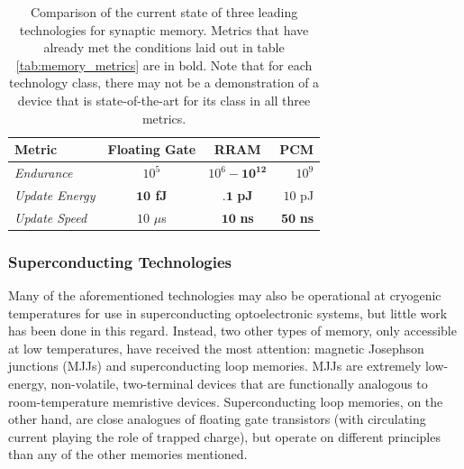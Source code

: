 \documentclass[twocolumn]{article}
\begin{document}
\begin{table}[h!]
  \begin{center}
    \label{tab:memory_comparison}
    \begin{tabular}{l|c|c|r} %
      \textbf{Metric} & \textbf{Floating Gate} & \textbf{RRAM} &\textbf{PCM} \\
      \hline
      \textit{Endurance} & $10^{5}$ & $10^{6}-\mathbf{10^{12}}$ & $10^{9}$  \\
      \textit{Update Energy} & \textbf{$\textbf{10}$ fJ} & $\textbf{.1}$ \textbf{pJ} & $10$ pJ\\
      \textit{Update Speed} & $10$ $\mu$s  & $\textbf{10}$ \textbf{ns} & $\textbf{50}$ \textbf{ns}\\
    \end{tabular}
    \caption{Comparison of the current state of three leading technologies for synaptic memory. Metrics that have already met the conditions laid out in table \ref{tab:memory_metrics} are in bold. Note that for each technology class, there may not be a demonstration of a device that is state-of-the-art for its class in all three metrics.}
  \end{center}
\end{table}

\subsubsection{Superconducting Technologies}
Many of the aforementioned technologies may also be operational at cryogenic temperatures for use in superconducting optoelectronic systems, but little work has been done in this regard. Instead, two other types of memory, only accessible at low temperatures, have received the most attention: magnetic Josephson junctions (MJJs) and superconducting loop memories. MJJs are extremely low-energy, non-volatile, two-terminal devices that are functionally analogous to room-temperature memristive devices. Superconducting loop memories, on the other hand, are close analogues of floating gate transistors (with circulating current playing the role of trapped charge), but operate on different principles than any of the other memories mentioned.
\end{document}
